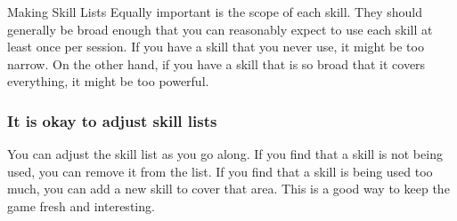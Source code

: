 \begin{multicols}{2}
\begin{CommentBox}{Making Skill Lists}
		Equally important is the scope of each skill. They should generally be broad enough that you can reasonably expect to use each skill at least once per session. If you have a skill that you never use, it might be too narrow. On the other hand, if you have a skill that is so broad that it covers everything, it might be too powerful.

		\subsubsection*{It is okay to adjust skill lists}
		You can adjust the skill list as you go along. If you find that a skill is not being used, you can remove it from the list. If you find that a skill is being used too much, you can add a new skill to cover that area. This is a good way to keep the game fresh and interesting.
	\end{CommentBox}

	\end{multicols}

\EndBoxPage

\BeginBoxPage



